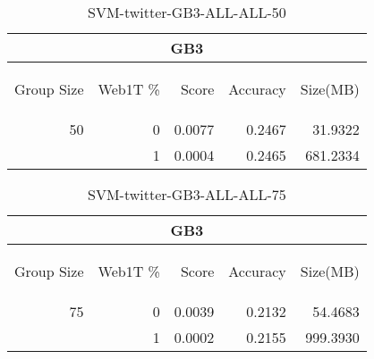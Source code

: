 \begin{center}
\begin{table}[htbp] 
 \begin{center}
\begin{tabular}{ | r | r | r | r | r |}
\hline
\multicolumn{5}{|c|}{GB3}\\
\hline
\begin{sideways}Group Size\end{sideways} & \begin{sideways}Web1T \%\end{sideways} & \begin{sideways}Score\end{sideways} & \begin{sideways}Accuracy\end{sideways} & \begin{sideways}Size(MB)\end{sideways}\\
\hline
\multirow{1}{*}{50}
 & 0 & 0.0077 & 0.2467 & 31.9322\\ \cline{2-5}
 & 1 & 0.0004 & 0.2465 & 681.2334\\ \cline{2-5}
\hline
\end{tabular}
\caption{SVM-twitter-GB3-ALL-ALL-50}
\label{table:SVM-twitter-GB3-ALL-ALL-50}
\end{center}
 \end{table}
\end{center}

\begin{center}
\begin{table}[htbp] 
 \begin{center}
\begin{tabular}{ | r | r | r | r | r |}
\hline
\multicolumn{5}{|c|}{GB3}\\
\hline
\begin{sideways}Group Size\end{sideways} & \begin{sideways}Web1T \%\end{sideways} & \begin{sideways}Score\end{sideways} & \begin{sideways}Accuracy\end{sideways} & \begin{sideways}Size(MB)\end{sideways}\\
\hline
\multirow{1}{*}{75}
 & 0 & 0.0039 & 0.2132 & 54.4683\\ \cline{2-5}
 & 1 & 0.0002 & 0.2155 & 999.3930\\ \cline{2-5}
\hline
\end{tabular}
\caption{SVM-twitter-GB3-ALL-ALL-75}
\label{table:SVM-twitter-GB3-ALL-ALL-75}
\end{center}
 \end{table}
\end{center}


